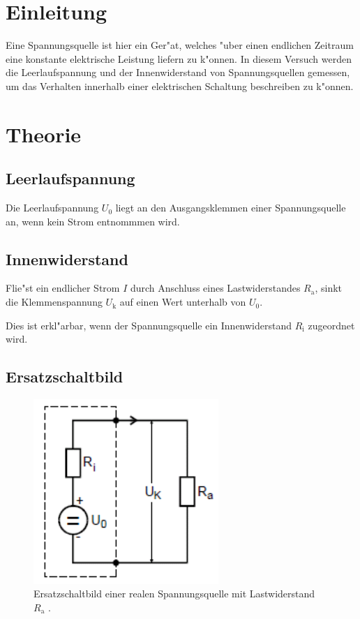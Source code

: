 \section{Einleitung} %
\label{sec:einleitung}

Eine Spannungsquelle ist hier ein Ger"at, welches "uber einen endlichen Zeitraum eine konstante elektrische Leistung liefern zu k"onnen. In diesem Versuch werden die Leerlaufspannung und der Innenwiderstand von Spannungsquellen gemessen, um das Verhalten innerhalb einer elektrischen Schaltung beschreiben zu k"onnen.

\section{Theorie} %
\label{sec:theorie}


\subsection{Leerlaufspannung} %
\label{sub:leerlaufspannung}

Die Leerlaufspannung $U_\mathrm{0}$ liegt an den Ausgangsklemmen einer Spannungsquelle an, wenn kein Strom entnommmen wird.

\subsection{Innenwiderstand} %
\label{sub:klemmenspannung}

Flie"st ein endlicher Strom $I$ durch Anschluss eines Lastwiderstandes $R_\mathrm{a}$, sinkt die Klemmenspannung $U_\mathrm{k}$ auf einen Wert unterhalb von $U_\mathrm{0}$.

Dies ist erkl"arbar, wenn der Spannungsquelle ein Innenwiderstand $R_\mathrm{i}$ zugeordnet wird.

\subsection{Ersatzschaltbild} %
\label{sub:ersatzschaltbild}

\begin{figure}
	\centering
	\includegraphics[width = 7cm]{img/Monozelle.PNG}
	\caption{Ersatzschaltbild einer realen Spannungsquelle mit Lastwiderstand $R_\mathrm{a}$ \cite{anleitung}.}
	\label{monozelle}
\end{figure}

